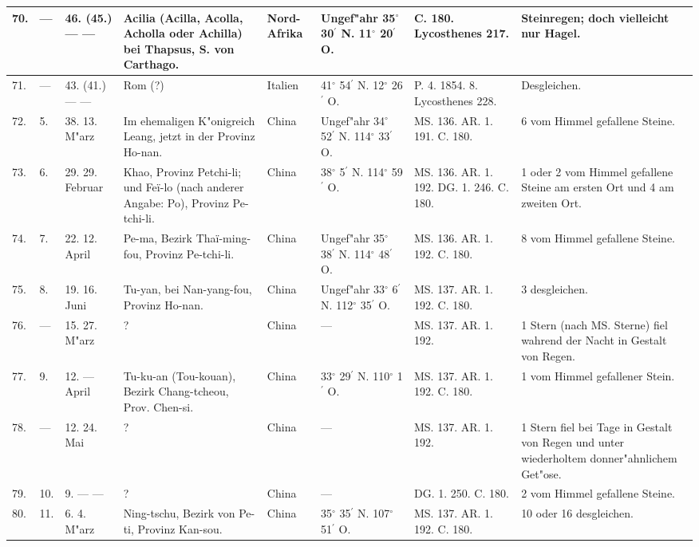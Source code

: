 \documentclass[a4paper, 8pt, oneside, polutonikogreek, german]{article}
\begin{document}
\begin{center}
\begin{longtable}{| p{5mm} | p{3mm} | p{15mm} | p{25mm} | p{20mm} | p{14mm} | p{17mm} | p{24mm} |}
        70. & --- & 46. (45.) --- --- & Acilia (Acilla, Acolla, Acholla oder Achilla) bei Thapsus, S. von Carthago. & Nord-Afrika & Ungef"ahr 35$^\circ$ 30$^\prime$ N. 11$^\circ$ 20$^\prime$ O. & C. 180. Lycosthenes 217. & Steinregen; doch vielleicht nur Hagel. \\ \hline
        71. & --- & 43. (41.) --- --- & Rom (?) & Italien & 41$^\circ$ 54$^\prime$ N. 12$^\circ$ 26$^\prime$ O. & P. 4. 1854. 8. Lycosthenes 228. & Desgleichen. \\ \hline
        72. & 5. & 38. 13. M"arz & Im ehemaligen K"onigreich Leang, jetzt in der Provinz Ho-nan. & China & Ungef"ahr 34$^\circ$ 52$^\prime$ N. 114$^\circ$ 33$^\prime$ O. & MS. 136. AR. 1. 191. C. 180. & 6 vom Himmel gefallene Steine. \\ \hline
        73. & 6. & 29. 29. Februar & Khao, Provinz Petchi-li; und Feï-lo (nach anderer Angabe: Po), Provinz Pe-tchi-li. & China & 38$^\circ$ 5$^\prime$ N. 114$^\circ$ 59$^\prime$ O. & MS. 136. AR. 1. 192. DG. 1. 246. C. 180. & 1 oder 2 vom Himmel gefallene Steine am ersten Ort und 4 am zweiten Ort. \\ \hline
        74. & 7. & 22. 12. April & Pe-ma, Bezirk Thaï-ming-fou, Provinz Pe-tchi-li. & China & Ungef"ahr 35$^\circ$ 38$^\prime$ N. 114$^\circ$ 48$^\prime$ O. & MS. 136. AR. 1. 192. C. 180. & 8 vom Himmel gefallene Steine. \\ \hline
        75. & 8. & 19. 16. Juni & Tu-yan, bei Nan-yang-fou, Provinz Ho-nan. & China & Ungef"ahr 33$^\circ$ 6$^\prime$ N. 112$^\circ$ 35$^\prime$ O. & MS. 137. AR. 1. 192. C. 180. & 3 desgleichen. \\ \hline
        76. & --- & 15. 27. M"arz & ? & China & --- & MS. 137. AR. 1. 192. & 1 Stern (nach MS. Sterne) fiel wahrend der Nacht in Gestalt von Regen. \\ \hline
        77. & 9. & 12. --- April & Tu-ku-an (Tou-kouan), Bezirk Chang-tcheou, Prov. Chen-si. & China & 33$^\circ$ 29$^\prime$ N. 110$^\circ$ 1$^\prime$ O. & MS. 137. AR. 1. 192. C. 180. & 1 vom Himmel gefallener Stein. \\ \hline
        78. & --- & 12. 24. Mai & ? & China & --- & MS. 137. AR. 1. 192. & 1 Stern fiel bei Tage in Gestalt von Regen und unter wiederholtem donner"ahnlichem Get"ose. \\ \hline
        79. & 10. & 9. --- --- & ? & China & --- & DG. 1. 250. C. 180. & 2 vom Himmel gefallene Steine. \\ \hline
        80. & 11. & 6. 4. M"arz & Ning-tschu, Bezirk von Pe-ti, Provinz Kan-sou. & China & 35$^\circ$ 35$^\prime$ N. 107$^\circ$ 51$^\prime$ O. & MS. 137. AR. 1. 192. C. 180. & 10 oder 16 desgleichen. \\ \hline

\end{longtable}
\end{center}
\end{document}
